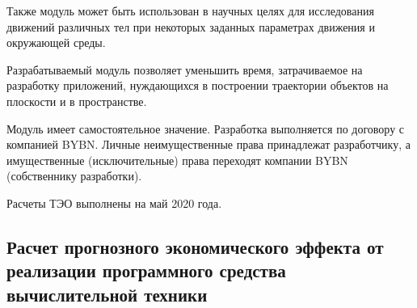 Также модуль может быть использован в научных целях для исследования движений различных тел при некоторых заданных параметрах движения и окружающей среды.

Разрабатываемый модуль позволяет уменьшить время, затрачиваемое на разработку приложений, нуждающихся в построении траектории объектов на плоскости и в пространстве.

Модуль имеет самостоятельное значение. Разработка выполняется по договору с компанией BYBN. Личные неимущественные права принадлежат разработчику, а имущественные (исключительные) права переходят компании BYBN (собственнику разработки).

Расчеты ТЭО выполнены на май 2020 года.

\subsection{Расчет прогнозного экономического эффекта от реализации программного средства вычислительной техники}
